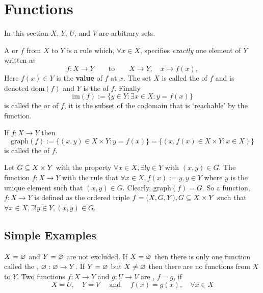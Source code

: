 \section{Functions}

\begin{center}
    In this section $X$, $Y$, $U$, and $V$ are arbitrary sets.
\end{center}

A  or  $f$ from $X$ to $Y$ is a rule which, $\forall x \in X$, specifies \emph{exactly} one element of $Y$ written as
$$
f : X \to Y \qquad \text{to} \qquad X \to Y, \quad x \mapsto f(x),
$$
Here $f(x) \in Y$ is the \textbf{value} of $f$ at $x$. The set $X$ is called the  of $f$ and is denoted $\text{dom}(f)$ and $Y$ is the  of $f$. Finally
$$
\text{im}(f) := \{y \in Y: \exists x \in X : y = f(x)\}
$$
is called the  or  of $f$, it is the subset of the codomain that is `reachable' by the function.

If $f : X \to Y$ then
$$
\text{graph}(f) := \{(x,y) \in X \times Y : y = f(x)\} = \{(x,f(x) \in X \times Y: x \in X)\}
$$
is called the  of $f$.

\begin{remark}
    Let $G \subseteq X \times Y$ with the property $\forall x \in X, \exists! y \in Y$ with $(x,y) \in G$. The function $f : X \to Y$ with the rule that $\forall x \in X, f(x) := y, y \in Y$ where $y$ is the unique element such that $(x,y) \in G$. Clearly, $\text{graph}(f) = G$. So a function, $f:X\to Y$ is defined as the ordered triple $f = (X,G,Y), G \subseteq X \times Y$ such that $\forall x \in X, \exists! y \in Y, (x,y) \in G$.
\end{remark}

\subsection{Simple Examples}

$X = \varnothing$ and $Y = \varnothing$ are not excluded. If $X = \varnothing$ then there is only one function called the , $\varnothing : \varnothing \to Y$. If $Y = \varnothing$ but $X \neq \varnothing$ then there are no functions from $X$ to $Y$. Two functions $f : X \to Y$ and $g : U \to V$ are , $f = g$, if
$$
X = U, \quad Y = V\quad \text{ and } \quad f(x) = g(x), \quad \forall x \in X
$$

